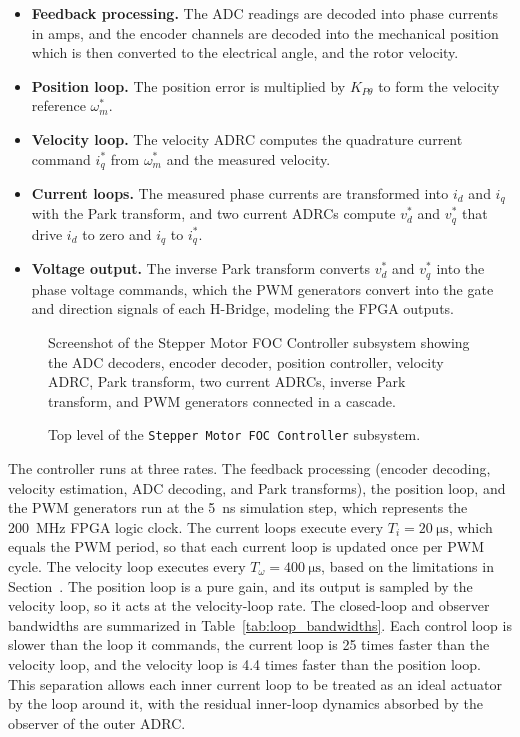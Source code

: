 \begin{itemize}
	\item \textbf{Feedback processing.} The ADC readings are decoded into phase currents in amps, and the encoder channels are decoded into the mechanical position which is then converted to the electrical angle, and the rotor velocity.
	
	\item \textbf{Position loop.} The position error is multiplied by $K_{P\theta}$ to form the velocity reference $\omega_m^{*}$.
	
	\item \textbf{Velocity loop.} The velocity ADRC computes the quadrature current command $i_q^{*}$ from $\omega_m^{*}$ and the measured velocity.
	
	\item \textbf{Current loops.} The measured phase currents are transformed into $i_d$ and $i_q$ with the Park transform, and two current ADRCs compute $v_d^{*}$ and $v_q^{*}$ that drive $i_d$ to zero and $i_q$ to $i_q^{*}$.
	
	\item \textbf{Voltage output.} The inverse Park transform converts
	$v_d^{*}$ and $v_q^{*}$ into the phase voltage commands, which the PWM generators convert into the gate and direction signals of each H-Bridge, modeling the FPGA outputs. 
\end{itemize}

\begin{figure}[htbp]
	\centering
		{Screenshot of the Stepper Motor FOC Controller subsystem showing the ADC decoders, encoder decoder, position controller, velocity ADRC, Park transform, two current ADRCs, inverse Park transform, and PWM generators connected in a cascade.}
	\caption[Top level of the FOC controller]{Top level of the \texttt{Stepper Motor FOC Controller} subsystem.}
	\label{fig:foc_controller_top}
\end{figure}
The controller runs at three rates. The feedback processing (encoder decoding, velocity estimation, ADC decoding, and Park transforms), the position loop, and the PWM generators run at the \SI{5}{\nano\second} simulation step, which represents the \SI{200}{\mega\hertz} FPGA logic clock. The current loops execute every $T_i = \SI{20}{\micro\second}$, which equals the PWM period, so that each current loop is updated once per PWM cycle. The velocity loop executes every $T_\omega = \SI{400}{\micro\second}$, based on the limitations in Section~. The position loop is a pure gain, and its output is sampled by the velocity loop, so it acts at the velocity-loop rate. The closed-loop and observer bandwidths are summarized in Table~\ref{tab:loop_bandwidths}. Each control loop is slower than the loop it commands, the current loop is 25 times faster than the velocity loop, and the velocity loop is 4.4 times faster than the position loop. This separation allows each inner current loop to be treated as an ideal actuator by the loop around it, with the residual inner-loop dynamics absorbed by the observer of the outer ADRC. 

